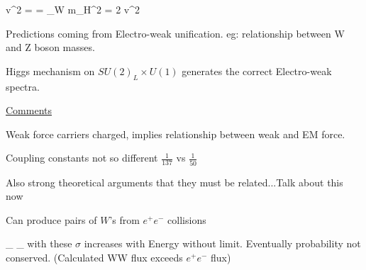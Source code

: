{\be
v^2 =   \GeV  \hspace*{1in}  = \cos \theta_W \hspace*{1in} m_H^2 = 2 \lambda v^2
\ee

Predictions coming from Electro-weak unification.
eg: relationship between W and Z boson masses.


Higgs mechanism on $SU(2)_L \times U(1)$ generates the correct Electro-weak spectra. 

\clearpage

\underline{Comments}
\bi
\item[-] Weak force carriers charged, implies relationship between weak and EM force.
\item[-] Coupling constants not so different $\frac{1}{137}$ vs $\frac{1}{50}$
\item[-] Also strong theoretical arguments that they must be related...Talk about this now
\ei

Can produce pairs of $W$'s from $e^+e^-$ collisions

\be
{}_{}
\hspace*{0.7in}
_{}
\ee
with these $\sigma$ increases with Energy without limit.
Eventually probability not conserved.  (Calculated WW flux exceeds $e^+e^-$ flux)

}
